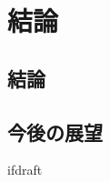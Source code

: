 \documentclass[a4paper,twoside,12pt,papersize, dvipdfmx]{iirthesis}
\begin{document}
    \newcommand{\figref}[1]{\figurename\ref{#1}}
    \newcommand{\tabref}[1]{\tablename\ref{#1}}
    \renewcommand{\eqref}[1]{式~(\ref{#1})}
    \newcommand{\chapref}[1]{\ref{#1}章}
    \newcommand{\secref}[1]{\ref{#1}節}
    \newcommand{\ssecref}[1]{\ref{#1}項}
    \newcommand{\appref}[1]{付録\ref{#1}}
\fi

\minitoc

\chapter{結論}\label{chap:conclusion}
\section{結論}\label{sec:conclusion:conclusion}

\section{今後の展望}\label{sec:conclusion:future}



\expandafter\ifx\csname ifdraft\endcsname\relax
    
\end{document}

